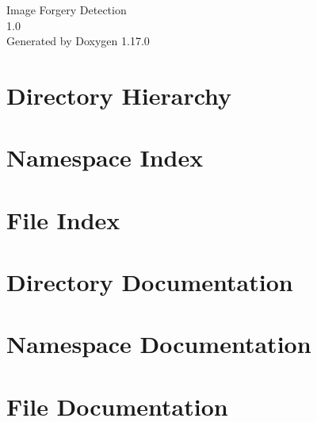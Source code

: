 \documentclass[twoside]{book}
\newcommand{\+}{\discretionary{\mbox{\scriptsize$\hookleftarrow$}}{}{}}
\newcommand{\clearemptydoublepage}{%
    \newpage{\pagestyle{empty}\cleardoublepage}%
  }
\begin{document}
  \raggedbottom
    \hypersetup{pageanchor=false,
                bookmarksnumbered=true,
                pdfencoding=unicode
               }
  \begin{titlepage}
  \vspace*{7cm}
  \begin{center}%
  {\Large Image Forgery Detection}\\
  [1ex]\large 1.\+0 \\
  \vspace*{1cm}
  {\large Generated by Doxygen 1.17.0}\\
  \end{center}
  \end{titlepage}
  \clearemptydoublepage
  \tableofcontents
  \clearemptydoublepage
  \hypersetup{pageanchor=true}

\chapter{Directory Hierarchy}

\chapter{Namespace Index}

\chapter{File Index}

\chapter{Directory Documentation}



\chapter{Namespace Documentation}






\chapter{File Documentation}







  \backmatter
  \newpage
  \clearemptydoublepage
  \printindex
\end{document}
